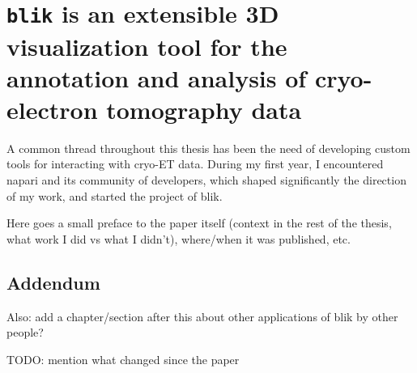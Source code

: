 \chapter[\texttt{blik}: a cryo-ET visualisation and analysis tool]{\texttt{blik} is an extensible 3D visualization tool for the annotation and analysis of cryo-electron tomography data}\label{blik}

A common thread throughout this thesis has been the need of developing custom tools for interacting with cryo-ET data.
During my first year, I encountered napari and its community of developers, which shaped significantly the direction of my work, and started the project of blik.

Here goes a small preface to the paper itself (context in the rest of the thesis, what work I did vs what I didn't), where/when it was published, etc.

\localtableofcontents  %

% 

\section{Addendum}

Also: add a chapter/section after this about other applications of blik by other people?

TODO: mention what changed since the paper
